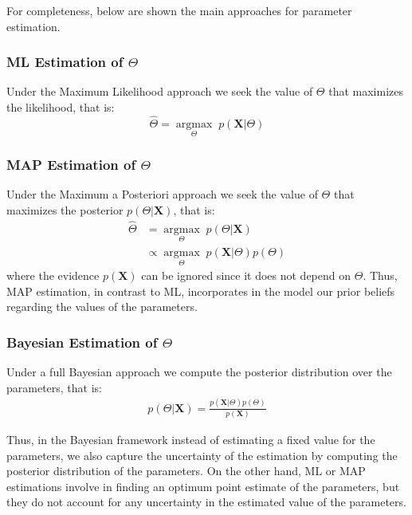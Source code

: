 For completeness, below are shown the main approaches for parameter estimation.

\subsubsection*{ML Estimation of $\Theta$}
Under the Maximum Likelihood approach we seek the value of $\Theta$ that maximizes the likelihood, that is:
\begin{equation} \label{MLE-f-bayes}
	\hat{\Theta} =  \underset{\Theta}{\operatorname{argmax}} \; p(\mathbf{X}|\Theta)
\end{equation}

\subsubsection*{MAP Estimation of $\Theta$}
Under the Maximum a Posteriori approach we seek the value of $\Theta$ that maximizes the posterior $p(\Theta | \mathbf{X})$, that is:
\begin{equation} \label{MAP-f-bayes}
  \begin{aligned}
	\hat{\Theta} & =  \underset{\Theta}{\operatorname{argmax}} \; p(\Theta | \mathbf{X}) \\
	& \propto \underset{\Theta}{\operatorname{argmax}} \; p(\mathbf{X}|\Theta) p(\Theta)
  \end{aligned}
\end{equation}
where the evidence $p(\mathbf{X})$ can be ignored since it does not depend on $\Theta$. Thus, MAP estimation, in contrast to ML, incorporates in the model our prior beliefs regarding the values of the parameters.

\subsubsection*{Bayesian Estimation of $\Theta$}
Under a full Bayesian approach we compute the posterior distribution over the parameters, that is:
\begin{equation} \label{posterior-f-bayes}
  \begin{aligned}
	p(\Theta | \mathbf{X}) = \frac{p(\mathbf{X}|\Theta) p(\Theta)}{p(\mathbf{X})} 
  \end{aligned}
\end{equation}

Thus, in the Bayesian framework instead of estimating a fixed value for the parameters, we also capture the uncertainty of the estimation by computing the posterior distribution of the parameters. On the other hand, ML or MAP estimations involve in finding an optimum point estimate of the parameters, but they do not account for any uncertainty in the estimated value of the parameters. 

